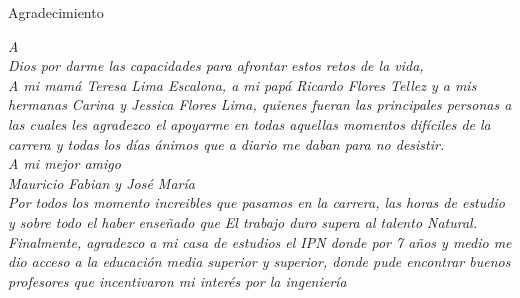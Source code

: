 \begin{dedication}
Agradecimiento






\begin{flushright}
	\textit{A \\ Dios por darme las capacidades para afrontar estos retos de la vida, \\
		A mi mamá Teresa Lima Escalona, a mi papá Ricardo Flores Tellez y  a mis hermanas Carina y Jessica Flores Lima, quienes fueran las principales personas a las cuales les agradezco el apoyarme en todas aquellas momentos difíciles de la carrera y todas  los días ánimos que a diario me daban para no desistir.
			\newline
	\\ A mi mejor amigo \\
	Mauricio Fabian y José María \\
	Por todos los momento increibles que pasamos en la carrera, las horas de estudio y sobre todo el haber enseñado que El trabajo duro supera al talento Natural.
 }
	\newline
	\newline
		\textit{Finalmente, agradezco a mi casa de estudios el IPN donde por 7 años y medio me dio acceso a la 
			educación media superior y superior, donde pude encontrar buenos profesores que incentivaron 
			mi interés por la ingeniería}
\end{flushright}

\end{dedication}
